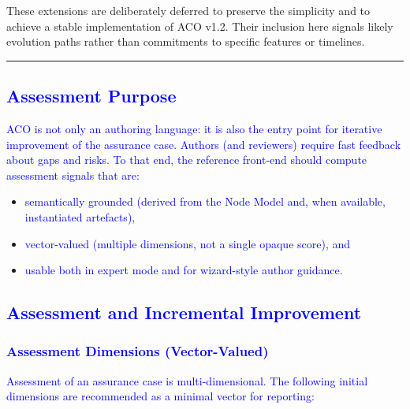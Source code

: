 \documentclass[11pt,twoside,a4paper]{article}
\begin{document}
These extensions are deliberately deferred to preserve the simplicity and to achieve a stable implementation
of ACO v1.2. Their inclusion here signals likely evolution paths
rather than commitments to specific features or timelines.

\bigskip
\hrule
\bigskip


\subsection{\textcolor{blue}{Assessment Purpose}}

\textcolor{blue}{ACO is not only an authoring language: it is also the entry point for iterative improvement of the assurance case. Authors (and reviewers) require fast feedback about gaps and risks. To that end, the reference front-end should compute assessment signals that are:}
\begin{itemize}[leftmargin=2em]
  \item \textcolor{blue}{semantically grounded (derived from the Node Model and, when available, instantiated artefacts),}
  \item \textcolor{blue}{vector-valued (multiple dimensions, not a single opaque score), and}
  \item \textcolor{blue}{usable both in expert mode and for wizard-style author guidance.}
\end{itemize}

\subsection{\textcolor{blue}{Assessment and Incremental Improvement}}\label{sec:assessment}

\subsubsection{\textcolor{blue}{Assessment Dimensions (Vector-Valued)}}

\textcolor{blue}{Assessment of an assurance case is multi-dimensional. The following initial dimensions are recommended as a minimal vector for reporting:}
\end{document}
